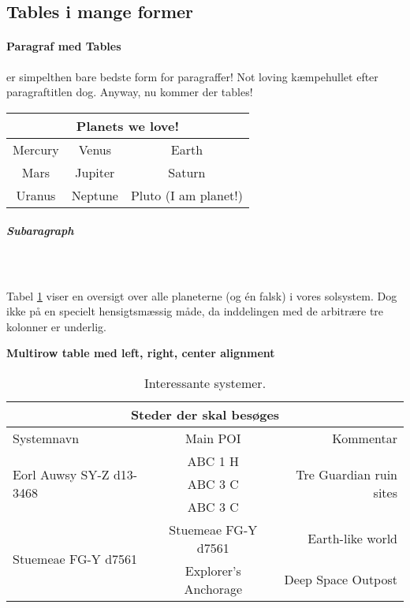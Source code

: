 \subsection{Tables i mange former}
\paragraph{Paragraf med Tables}er simpelthen bare bedste form for paragraffer! Not loving kæmpehullet efter paragraftitlen dog. Anyway, nu kommer der tables!


\begin{center}
    \begin{tabular}[H]{ |c|c|c| }
        \hline
        \multicolumn{3}{|c|}{Planets we love!} \\
        \hline
        Mercury & Venus & Earth \\ 
        Mars & Jupiter & Saturn \\  
        Uranus & Neptune  & Pluto (I am planet!)\\   
        \hline
    \end{tabular}
\label{tab:planets}
\end{center}

\subparagraph{Subaragraph}
\lipsum[2]
\\
\\
Tabel \ref{table:systems} viser en oversigt over alle planeterne (og én falsk) i vores solsystem. Dog ikke på en specielt hensigtsmæssig måde, da inddelingen med de arbitrære tre kolonner er underlig.
\vspace{0.5cm}

\begin{table}[H]
    \caption{\textbf{Multirow table med left, right, center alignment}}
    \begin{center}
        \begin{tabular}{ |l|c|r| } 
            \hline
            \multicolumn{3}{|c|}{\textbf{Steder der skal besøges}} \\
            \hline
            Systemnavn & Main POI & Kommentar \\
            \hline
            \multirow{3}{5cm}{Eorl Auwsy SY-Z d13-3468} & ABC 1 H & \multirow{3}{3cm}{Tre Guardian ruin sites} \\ 
            & ABC 3 C &  \\ 
            & ABC 3 C &  \\ 
            \hline
            \multirow{2}{5cm}{Stuemeae FG-Y d7561} & Stuemeae FG-Y d7561 & Earth-like world \\
            & Explorer's Anchorage & Deep Space Outpost \\ 
            \hline
        \end{tabular}
        \caption{Interessante systemer. \cite{edsm}}
        \label{table:systems}
    \end{center}
\end{table}